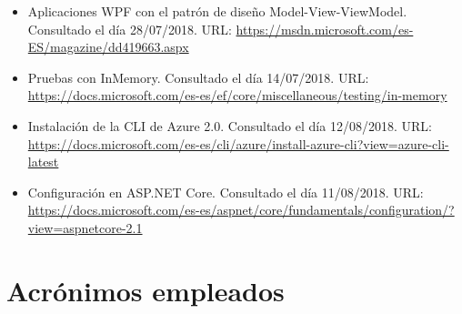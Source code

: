 \documentclass[11pt,spanish,listoffigures]{tfgetsinf}
\begin{document}
{\begin{itemize}
\item Aplicaciones WPF con el patrón de diseño Model-View-ViewModel. Consultado el día 28/07/2018. URL: \url{https://msdn.microsoft.com/es-ES/magazine/dd419663.aspx}

\item Pruebas con InMemory. Consultado el día 14/07/2018. URL: \url{https://docs.microsoft.com/es-es/ef/core/miscellaneous/testing/in-memory}

\item Instalación de la CLI de Azure 2.0. Consultado el día 12/08/2018. URL: \url{https://docs.microsoft.com/es-es/cli/azure/install-azure-cli?view=azure-cli-latest}

\item Configuración en ASP.NET Core. Consultado el día 11/08/2018. URL: \url{https://docs.microsoft.com/es-es/aspnet/core/fundamentals/configuration/?view=aspnetcore-2.1}

\end{itemize}
}


\APPENDIX


\chapter{Acrónimos empleados}
\end{document}
